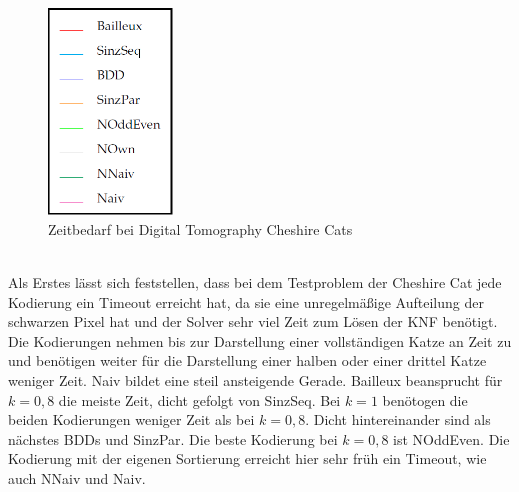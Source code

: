 \documentclass[a4,abstract=on]{scrartcl}
\begin{document}

\begin{figure}[htbp]
\includegraphics[width=3.3cm]{Legende.png}
\caption{Zeitbedarf bei Digital Tomography Cheshire Cats}
\label{fig:cheshire}
\end{figure}
\ \\
Als Erstes lässt sich feststellen, dass bei dem Testproblem der Cheshire Cat jede Kodierung ein Timeout erreicht hat, da sie eine unregelmäßige Aufteilung der schwarzen Pixel hat und der Solver sehr viel Zeit zum Lösen der KNF benötigt. Die Kodierungen nehmen bis zur Darstellung einer vollständigen Katze an Zeit zu und benötigen weiter für die Darstellung einer halben oder einer drittel Katze weniger Zeit. Naiv bildet eine steil ansteigende Gerade. Bailleux beansprucht für $k=0,8$ die meiste Zeit, dicht gefolgt von SinzSeq. Bei $k=1$ benötogen die beiden Kodierungen weniger Zeit als bei $k=0,8$. Dicht hintereinander sind als nächstes BDDs und SinzPar. Die beste Kodierung bei $k=0,8$ ist NOddEven. Die Kodierung mit der eigenen Sortierung erreicht hier sehr früh ein Timeout, wie auch NNaiv und Naiv. 
\end{document}
